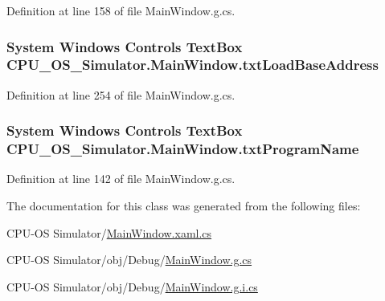 Definition at line 158 of file Main\+Window.\+g.\+cs.

\hypertarget{class_c_p_u___o_s___simulator_1_1_main_window_ae6c0ce6078d081b2cb99518c68f1cd85}{}
\subsubsection[{txt\+Load\+Base\+Address}]{\setlength{\rightskip}{0pt plus 5cm}System Windows Controls Text\+Box C\+P\+U\+\_\+\+O\+S\+\_\+\+Simulator.\+Main\+Window.\+txt\+Load\+Base\+Address\hspace{0.3cm}{\ttfamily [package]}}\label{class_c_p_u___o_s___simulator_1_1_main_window_ae6c0ce6078d081b2cb99518c68f1cd85}


Definition at line 254 of file Main\+Window.\+g.\+cs.

\hypertarget{class_c_p_u___o_s___simulator_1_1_main_window_a2c64b45db8c1d7a30c2f9155899cf918}{}
\subsubsection[{txt\+Program\+Name}]{\setlength{\rightskip}{0pt plus 5cm}System Windows Controls Text\+Box C\+P\+U\+\_\+\+O\+S\+\_\+\+Simulator.\+Main\+Window.\+txt\+Program\+Name\hspace{0.3cm}{\ttfamily [package]}}\label{class_c_p_u___o_s___simulator_1_1_main_window_a2c64b45db8c1d7a30c2f9155899cf918}


Definition at line 142 of file Main\+Window.\+g.\+cs.



The documentation for this class was generated from the following files\+:\begin{DoxyCompactItemize}
\item 
C\+P\+U-\/\+O\+S Simulator/\hyperlink{_main_window_8xaml_8cs}{Main\+Window.\+xaml.\+cs}\item 
C\+P\+U-\/\+O\+S Simulator/obj/\+Debug/\hyperlink{_debug_2_main_window_8g_8cs}{Main\+Window.\+g.\+cs}\item 
C\+P\+U-\/\+O\+S Simulator/obj/\+Debug/\hyperlink{_debug_2_main_window_8g_8i_8cs}{Main\+Window.\+g.\+i.\+cs}\end{DoxyCompactItemize}
